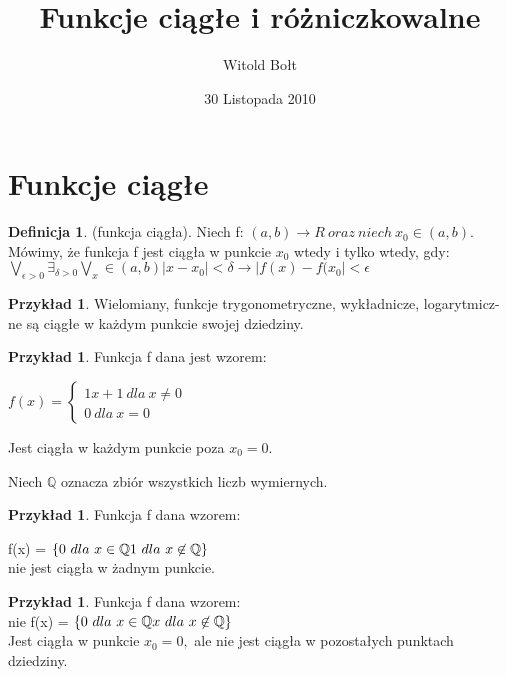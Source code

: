 \documentclass[12pt,a4paper]{article}
\title{Funkcje ciągłe i różniczkowalne}
\date{30 Listopada 2010}
\author{Witold Bołt}
\theoremstyle{definition}
\newtheorem{df}[tw]{Definicja}
\newtheorem{ex}[tw]{Przykład}
\begin{document}
 
\maketitle

\tableofcontents

\section{Funkcje ciągłe}

\begin{df}
(funkcja ciągła). Niech f: 
\begin{math} (a,b) \to R \ oraz \ niech \ x_{0} \in (a,b).
\end{math}
Mówimy, że funkcja f jest ciągła w punkcie $x_{0}$ wtedy i tylko wtedy, gdy:
\center $ \bigvee_{\epsilon>0}\exists_{\delta>0}  \bigvee_x \in (a,b) |x-x_{0}| < \delta\rightarrow |f(x)-f(x_{0}| < \epsilon  $ 
\end{df}
\begin{ex}
Wielomiany, funkcje trygonometryczne, wykładnicze, logarytmicz-
ne są ciągłe w każdym punkcie swojej dziedziny.
\end{ex}

\begin{ex}
Funkcja f dana jest wzorem:

	
\begin{center}
	 $f(x) =  \begin{cases} {1} x+1 \ dla  \ x \neq 0 
		\\  0 \ dla \ x = 0  \end{cases}$	
\end{center}	
	\end {ex} 

Jest ciągła w każdym punkcie poza $x_{0} = 0.$

Niech $\mathbb{Q}$ oznacza zbiór wszystkich liczb wymiernych.

\begin{ex}
Funkcja f dana wzorem:

f(x) = $ \left \lbrace  0 \ dla \ x \in \mathbb{Q}   \\
1 \ dla \ x \not \in \mathbb{Q}
 \right \rbrace $ \\
nie jest ciągła w żadnym punkcie.
\end{ex}

\begin{ex}
Funkcja f dana wzorem: \\nie 
f(x) = $ \left \lbrace 0 \ dla \ x \in \mathbb{Q} \\ 
	x \ dla \  x \not \in \mathbb{Q} \right \rbrace $ \\
Jest ciągła w punkcie $ x_{0} = 0, $ ale nie jest ciągła w pozostałych punktach dziedziny.
\end{ex}
\end{document}
